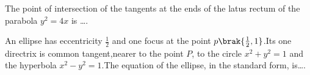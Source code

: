 \iffalse
 \title{ASSIGNMENT-1}
 \author{EE24BTECH11029- J SHRETHAN REDDY}
 \section{fitb}
\fi

     \item The point of intersection of the tangents at the ends of the latus rectum of the parabola $y^2=4x$ is \ldots.
    \hfill{}
    
    \item An ellipse has eccentricity $\frac{1}{2}$ and one focus at the point $p\brak{\frac{1}{2},1}$.Its one directrix is common tangent,nearer to the point $P$, to the circle $x^2+y^2=1$ and the hyperbola $x^2-y^2=1$.The equation of the ellipse, in the standard form, is\dots.
    \hfill{} 
